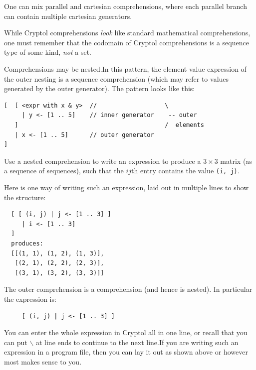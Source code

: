 \begin{tip}
  One can mix parallel and cartesian comprehensions, where each
  parallel branch can contain multiple cartesian
  generators.\indComp\indCartesian\indParallel
\end{tip}

\begin{tip}
  While Cryptol comprehensions \emph{look} like standard mathematical
  comprehensions, one must remember that the codomain of Cryptol
  comprehensions is a sequence type of some kind, \emph{not} a set.
\end{tip}

Comprehensions may be nested.\indNestedComp In this pattern, the
element value expression of the outer nesting is a sequence
comprehension (which may refer to values generated by the outer
generator). The pattern looks like this:

\begin{minipage}{\textwidth}  %
\begin{Verbatim}
[  [ <expr with x & y>  //                   \
     | y <- [1 .. 5]    // inner generator    -- outer
   ]                                         /  elements
   | x <- [1 .. 5]      // outer generator
]
\end{Verbatim}
\end{minipage}

\begin{Exercise}\label{ex:seq:6}
  Use a nested comprehension to write an expression to produce a
  $3\times3$ matrix (as a sequence of sequences), such that the $ij$th
  entry contains the value {\tt (i, j)}.
\end{Exercise}
\begin{Answer}
  Here is one way of writing such an expression, laid out in multiple
  lines to show the structure:
\begin{Verbatim}
  [ [ (i, j) | j <- [1 .. 3] ]
     | i <- [1 .. 3]
  ]
  produces:
  [[(1, 1), (1, 2), (1, 3)],
   [(2, 1), (2, 2), (2, 3)],
   [(3, 1), (3, 2), (3, 3)]]
\end{Verbatim}
The outer comprehension is a comprehension (and hence is nested). In
particular the expression is:
\begin{Verbatim}
     [ (i, j) | j <- [1 .. 3] ]
\end{Verbatim}
You can enter the whole expression in Cryptol all in one line, or
recall that you can put {\tt $\backslash$} at line ends to continue to
the next line.\indLineCont If you are writing such an expression in a
program file, then you can lay it out as shown above or however most
makes sense to you.
\end{Answer}

